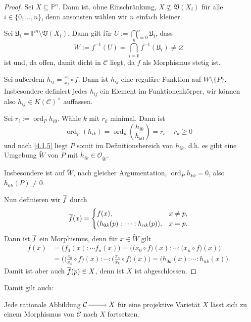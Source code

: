 \documentclass[a4paper,12pt,index=toc]{scrbook}
\theoremstyle{keinenummern} %
\def\CC{\mathcal{C}}
\def\V{\mathfrak{V}}
\def\O{\mathcal{O}}
\def\P{\mathbb{P}}
\def\U{\mathfrak{U}}
\newcommand{\ord}{\operatorname{ord}}
\newcommand{\leer}{\ensuremath{\varnothing}}
\renewcommand{\dotsc}{\ensuremath{\!...}}
\newcommand{\schlange}[1]{\widetilde{#1}}
\def\Bar#1{\ensuremath\overline{#1}}
\begin{document}
\begin{proof}
Sei $X\subseteq\P^{n}$. Dann ist, ohne Einschränkung, $X\not\subseteq\V(X_{i})$ für alle $i\in\{0,\dotsc,n\}$, denn ansonsten wählen wir $n$ einfach kleiner.

Sei $\U_{i}=\P^{n}\setminus\V(X_{i})$. Dann gilt für $\displaystyle U:=\bigcap_{i=0}^{n}\U_{i}$, dass
\begin{equation*}W:=f^{-1}(U)=\bigcap_{i=0}^{n}f^{-1}(\U_{i})\neq\leer\end{equation*}
ist und, da offen, damit dicht in $\CC$ liegt, da $f$ als Morphismus stetig ist.

Sei außerdem $h_{ij}=\frac{x_{i}}{x_{j}}\circ f$. Dann ist $h_{ij}$ eine reguläre Funktion auf $W\setminus\{P\}$. Insbesondere definiert jedes $h_{ij}$ ein Element im Funktionenkörper, wir können also $h_{ij}\in K(\CC)^{\times}$ auffassen.

Sei $r_{i}:=\ord_{P}h_{i0}$. Wähle $k$ mit $r_{k}$ minimal. Dann ist
\begin{equation*}\ord_{p}(h_{ik})=\ord_{p}\left(\frac{h_{i0}}{h_{k0}}\right)=r_{i}-r_{k}\geq 0\end{equation*}
und nach \cref{4.1.5} liegt $P$ somit im Definitionsbereich von $h_{ik}$, d.h. es gibt eine Umgebung $\schlange{W}$ von $P$ mit $h_{ik}\in\O_{\schlange{W}}$.

Insbesondere ist auf $\schlange{W}$, nach gleicher Argumentation, $\ord_{P}h_{kk}=0$, also $h_{kk}(P)\neq 0$.

Nun definieren wir $\Bar{f}$ durch
\begin{equation*}\Bar{f}(x)=\begin{cases}f(x),&x\neq p,\\(h_{0k}(p):\dotsm:h_{nk}(p)),&x=p.\end{cases}\end{equation*}
Dann ist $\Bar{f}$ ein Morphismus, denn für $x\in\schlange{W}$ gilt
\begin{align*}
f(x)&=\bigl(f_{0}(x):\dotsm f_{n}(x)\bigr)=\bigl(\bigl(x_{0}\circ f\bigr)(x):\dotsm:\bigl(x_{n}\circ f\bigr)(x)\bigr)\\
&=\bigl(\bigl(\tfrac{x_{0}}{x_{k}}\circ f\bigr)(x):\dotsm:\bigl(\tfrac{x_{n}}{x_{k}}\circ f\bigr)(x)\bigr)=\bigl(h_{0k}(x):\dotsm:h_{nk}(x)\bigr).
\end{align*}
Damit ist aber auch $\Bar{f}(p)\in X$, denn ist $X$ ist abgeschlossen.
\end{proof}

Damit gilt auch:
\begin{kor}\label{4.1.7}
Jede rationale Abbildung $\CC\ra X$ für eine projektive Varietät $X$ lässt sich zu einem Morphismus von $\CC$ nach $X$ fortsetzen.
\end{kor}
\end{document}

